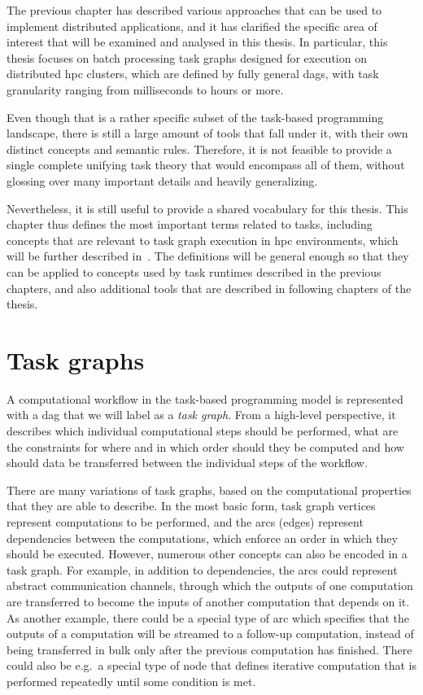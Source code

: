The previous chapter has described various approaches that can be used to implement distributed
applications, and it has clarified the specific area of interest that will be examined and analysed
in this thesis. In particular, this thesis focuses on batch processing task graphs designed for
execution on distributed \gls{hpc} clusters, which are defined by fully general
\glspl{dag}, with task granularity ranging from milliseconds to hours or more.

Even though that is a rather specific subset of the task-based programming landscape, there is
still a large amount of tools that fall under it, with their own distinct concepts and semantic
rules. Therefore, it is not feasible to provide a single complete unifying task theory that would
encompass all of them, without glossing over many important details and heavily generalizing.

Nevertheless, it is still useful to provide a shared vocabulary for this thesis. This chapter thus
defines the most important terms related to tasks, including concepts that are relevant to task
graph execution in \gls{hpc} environments, which will be further described
in~. The definitions will be general enough so that they can be applied to
concepts used by task runtimes described in the previous chapters, and also additional tools
that are described in following chapters of the thesis.

\section{Task graphs}
A computational workflow in the task-based programming model is represented with a
\gls{dag} that we will label as a \emph{task graph}. From a high-level
perspective, it describes which individual computational steps should be performed, what are the
constraints for where and in which order should they be computed and how should data be transferred
between the individual steps of the workflow.

There are many variations of task graphs, based on the computational properties that they are able
to describe. In the most basic form, task graph vertices represent computations to be performed,
and the arcs (edges) represent dependencies between the computations, which enforce an order in
which they should be executed. However, numerous other concepts can also be encoded in a task
graph. For example, in addition to dependencies, the arcs could represent abstract communication
channels, through which the outputs of one computation are transferred to become the inputs of
another computation that depends on it. As another example, there could be a special type of arc
which specifies that the outputs of a computation will be streamed to a follow-up computation,
instead of being transferred in bulk only after the previous computation has finished. There could
also be e.g.\ a special type of node that defines iterative computation that is performed
repeatedly until some condition is met.

